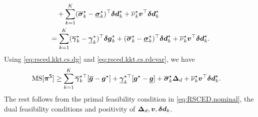 \begin{equation*}
\begin{aligned}
  &\quad + \sum_{k = 1}^K (\overline{{\bm{\sigma}}}^{\star}_k - \underline{{\bm{\sigma}}}^{\star}_k)^\top {\bm{\delta d}}^{\star}_k + \overline{\nu}^{\star}_k {{\bm{v}}}^\top {\bm{\delta d}}^{\star}_k \\
  &= \sum_{k = 1}^K (\overline{{\bm{\gamma}}}^{\star}_k - \underline{{\bm{\gamma}}}^{\star}_k)^\top {\bm{\delta g}}^{\star}_k + (\overline{{\bm{\sigma}}}^{\star}_k - \underline{{\bm{\sigma}}}^{\star}_k)^\top {\bm{\delta d}}^{\star}_k + \overline{\nu}^{\star}_k {{\bm{v}}}^\top {\bm{\delta d}}^{\star}_k.
  \label{eq:ms.bound.2}
\end{aligned}
\end{equation*}
Using \eqref{eq:rsced.kkt.cs.dg} and \eqref{eq:rsced.kkt.cs.rdcvar}, we have
{\small \begin{equation}
\begin{aligned}
  &{\rm MS}{}[{\bm{\pi}}^{{\sf S}}] \ge \sum_{k = 1}^K \overline{{\bm{\gamma}}}_k^{\star\top} [ \overline{{\bm{g}}} - {\bm{g}}^{\star} ] + \underline{{\bm{\gamma}}}_k^{\star\top} [ {\bm{g}}^{\star} - \underline{{\bm{g}}} ] + \overline{{\bm{\sigma}}}^{\star}_k {\bm{\Delta}}_d + \overline{\nu}^{\star}_k {{\bm{v}}}^\top {\bm{\delta d}}^{\star}_k.
  \label{eq:ms.bound.3}
\end{aligned}
\end{equation}}
The rest follows from the primal feasibility condition in \eqref{eq:RSCED.nominal}, the dual feasibility conditions and positivity of ${\bm{\Delta}}_d, {{\bm{v}}}, {\bm{\delta d}}_k$.

